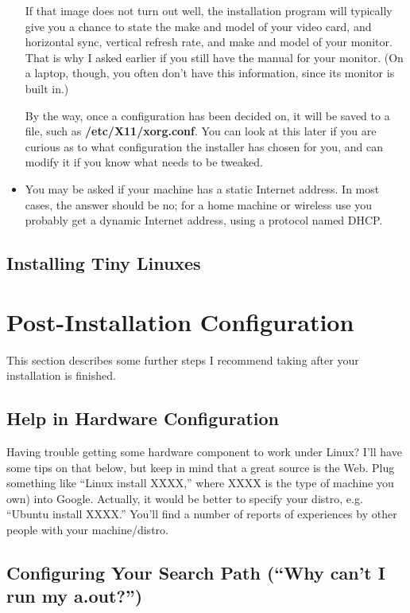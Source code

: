 \documentclass[11pt]{article}
\begin{document}
\begin{itemize}
If that image does not turn out well, the installation program will
typically give you a chance to state the make and model of your video
card, and horizontal sync, vertical refresh rate, and make and model of
your monitor.  That is why I asked earlier if you still have the manual
for your monitor.  (On a laptop, though, you often don't have this
information, since its monitor is built in.)

By the way, once a configuration has been decided on, it will be saved
to a file, such as {\bf /etc/X11/xorg.conf}.  You can look at this later
if you are curious as to what configuration the installer has chosen for
you, and can modify it if you know what needs to be tweaked. 

\item You may be asked if your machine has a static Internet address.
In most cases, the answer should be no; for a home machine or wireless
use you probably get a dynamic Internet address, using a protocol named
DHCP.

\end{itemize}

\subsection{Installing Tiny Linuxes}
\label{ancient}

\section{Post-Installation Configuration}

This section describes some further steps I recommend taking after your
installation is finished. 

\subsection{Help in Hardware Configuration}

Having trouble getting some hardware component to work under Linux?
I'll have some tips on that below, but keep in mind that a great source
is the Web.  Plug something like ``Linux install XXXX,'' where XXXX is
the type of machine you own) into Google.  Actually, it would be better
to specify your distro, e.g. ``Ubuntu install XXXX.'' You'll find a
number of reports of experiences by other people with your
machine/distro.  

\subsection{Configuring Your Search Path (``Why can't I run my a.out?'')}
\end{document}
